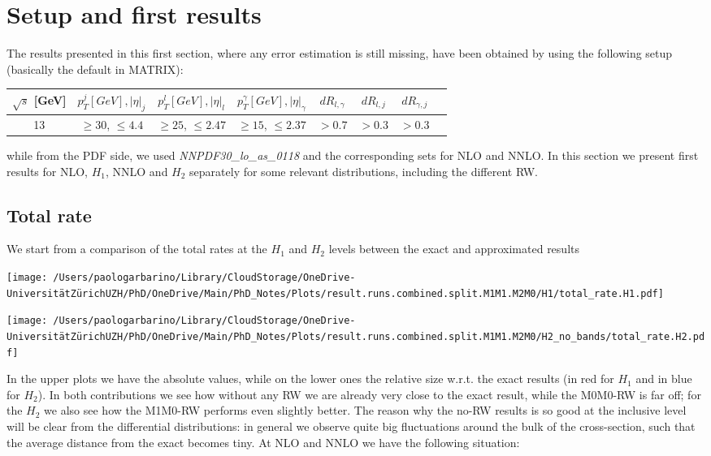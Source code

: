 \documentclass{report}
\begin{document}
\section{Setup and first results}
The results presented in this first section, where any error estimation is still missing, have been obtained by using the following setup (basically the default in MATRIX):

\vspace{0.5cm}
\begin{tabular}{cccccccc}
    \hline
    $\sqrt{s}$ [GeV] & $p_T^{j} [GeV], \left|\eta\right|_j$ & $p_T^{l} [GeV], \left|\eta\right|_l$ & $p_T^\gamma [GeV], \left|\eta\right|_\gamma$ & $dR_{l,\gamma}$ & $dR_{l,j}$ & $dR_{\gamma, j}$ \\
    \hline
    13 & $\geq 30$, $\leq 4.4$ & $\geq 25$, $\leq 2.47$ & $\geq 15$, $\leq 2.37$ & $>0.7$ & $>0.3$ & $>0.3$
\end{tabular}

\vspace{3mm}
while from the PDF side, we used \textit{NNPDF30\_lo\_as\_0118} and the corresponding sets for NLO and NNLO.
In this section we present first results for NLO, $H_1$, NNLO and $H_2$ separately for some relevant distributions, including the different RW.

\subsection{Total rate}
We start from a comparison of the total rates at the $H_1$ and $H_2$ levels between the exact and approximated results

\begin{minipage}{0.45\textwidth}
    \centering
    \texttt{[image: /Users/paologarbarino/Library/CloudStorage/OneDrive-UniversitätZürichUZH/PhD/OneDrive/Main/PhD\_Notes/Plots/result.runs.combined.split.M1M1.M2M0/H1/total\_rate.H1.pdf]}
\end{minipage}
\hfill
\begin{minipage}{0.45\textwidth}
    \centering
    \texttt{[image: /Users/paologarbarino/Library/CloudStorage/OneDrive-UniversitätZürichUZH/PhD/OneDrive/Main/PhD\_Notes/Plots/result.runs.combined.split.M1M1.M2M0/H2\_no\_bands/total\_rate.H2.pdf]}
\end{minipage}

In the upper plots we have the absolute values, while on the lower ones the relative size w.r.t. the exact results (in red for $H_1$ and in blue for $H_2$). In both contributions we see how without any RW we are already very close to the exact result, while the M0M0-RW is far off; 
for the $H_2$ we also see how the M1M0-RW performs even slightly better. The reason why the no-RW results is so good at the inclusive level will be clear from the differential distributions: in general we observe quite big fluctuations around the bulk of the cross-section, such that the 
average distance from the exact becomes tiny.
\newpage At NLO and NNLO we have the following situation:
\end{document}

